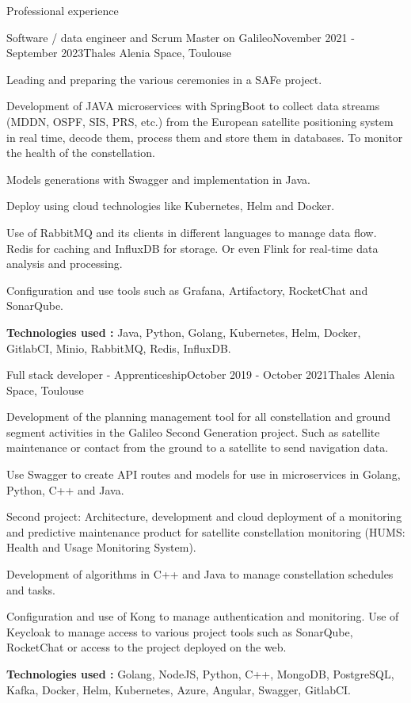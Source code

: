 \documentclass[
	10pt, %
]{resume}
\begin{document}
\begin{rSection}{Professional experience}
	\begin{rSubsection}{Software / data engineer and Scrum Master on Galileo}{November 2021 - September 2023}{Thales Alenia Space, Toulouse}{}
		\item Leading and preparing the various ceremonies in a SAFe project.
		\item Development of JAVA microservices with SpringBoot to collect data streams (MDDN, OSPF, SIS, PRS, etc.) from the European satellite positioning system in real time, decode them, process them and store them in databases. To monitor the health of the constellation.
 		\item Models generations with Swagger and implementation in Java.
		\item Deploy using cloud technologies like Kubernetes, Helm and Docker.
 		\item Use of RabbitMQ and its clients in different languages to manage data flow. Redis for caching and InfluxDB for storage. Or even Flink for real-time data analysis and processing.
		\item Configuration and use tools such as Grafana, Artifactory, RocketChat and SonarQube.
		\item \textbf{Technologies used :} Java, Python, Golang, Kubernetes, Helm, Docker, GitlabCI, Minio, RabbitMQ, Redis, InfluxDB.
	\end{rSubsection}

	\begin{rSubsection}{Full stack developer - Apprenticeship}{October 2019 - October 2021}{Thales Alenia Space, Toulouse}{}
		\item Development of the planning management tool for all constellation and ground segment activities in the Galileo Second Generation project. Such as satellite maintenance or contact from the ground to a satellite to send navigation data.
		\item Use Swagger to create API routes and models for use in microservices in Golang, Python, C++ and Java.
		\item Second project: Architecture, development and cloud deployment of a monitoring and predictive maintenance product for satellite constellation monitoring (HUMS: Health and Usage Monitoring System).
		\item Development of algorithms in C++ and Java to manage constellation schedules and tasks.		
		\item Configuration and use of Kong to manage authentication and monitoring. Use of Keycloak to manage access to various project tools such as SonarQube, RocketChat or access to the project deployed on the web.
		\item \textbf{Technologies used :} Golang, NodeJS, Python, C++, MongoDB, PostgreSQL, Kafka, Docker, Helm, Kubernetes, Azure, Angular, Swagger, GitlabCI.
	\end{rSubsection}


\end{rSection}
\end{document}
